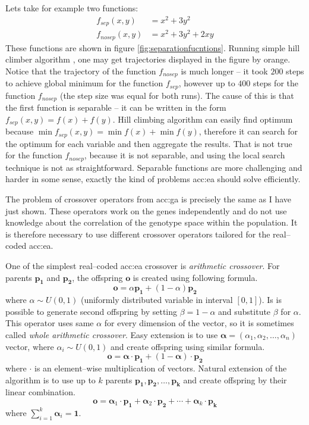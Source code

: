 Lets take for example two functions:
\begin{align*}
    f_{sep}(x,y)&=x^2+3y^2 \\
    f_{nosep}(x,y)&=x^2+3y^2+2xy
\end{align*}
These functions are shown in figure \ref{fig:separationfucntions}. Running simple hill climber algorithm \citep{HandbookOfMetaheuristics}, one may get trajectories displayed in the figure by orange. Notice that the trajectory of the function $f_{nosep}$ is much longer -- it took $200$ steps to achieve global minimum for the function $f_{sep}$, however up to $400$ steps for the function $f_{nosep}$ (the step size was equal for both runs). The cause of this is that the first function is separable -- it can be written in the form $f_{sep}(x,y)=f(x)+f(y)$. Hill climbing algorithm can easily find optimum because $\min f_{sep}(x,y)=\min f(x)+\min f(y)$, therefore it can search for the optimum for each variable and then aggregate the results. That is not true for the function $f_{nosep}$, because it is not separable, and using the local search technique is not as straightforward. Separable functions are more challenging and harder in some sense, exactly the kind of problems \acrshort{acc:ea} should solve efficiently.

The problem of crossover operators from \acrshort{acc:ga} is precisely the same as I have just shown. These operators work on the genes independently and do not use knowledge about the correlation of the genotype space within the population. It is therefore necessary to use different crossover operators tailored for the real--coded \acrshort{acc:ea}.

One of the simplest real--coded \acrshort{acc:ea} crossover is \emph{arithmetic crossover}. For parents $\mathbf{p_1}$ and $\mathbf{p_2}$, the offspring $\mathbf{o}$ is created using following formula.
$$
\mathbf{o} = \alpha\mathbf{p_1}+\left(1-\alpha\right)\mathbf{p_2}
$$
where $\alpha \sim U(0,1)$ (uniformly distributed variable in interval $\left[0,1\right]$). Is is possible to generate second offspring by setting $\beta=1-\alpha$ and substitute $\beta$ for $\alpha$. This operator uses same $\alpha$ for every dimension of the vector, so it is sometimes called \emph{whole arithmetic crossover}. Easy extension is to use $\boldsymbol{\alpha}=(\alpha_1,\alpha_2,\dots,\alpha_n)$ vector, where $\alpha_i\sim U(0,1)$ and create offspring using similar formula.
$$
\mathbf{o} = \boldsymbol{\alpha}\cdot\mathbf{p_1}+\left(1-\boldsymbol{\alpha}\right)\cdot\mathbf{p_2}
$$
where $\cdot$ is an element--wise multiplication of vectors.
Natural extension of the algorithm is to use up to $k$ parents $\mathbf{p_1}, \mathbf{p_2},\dots,\mathbf{p_k}$ and create offspring by their linear combination.
$$
\mathbf{o} = 
\boldsymbol{\alpha}_1\cdot\mathbf{p_1}+
\boldsymbol{\alpha}_2\cdot\mathbf{p_2}+
\cdots +
\boldsymbol{\alpha}_k\cdot\mathbf{p_k}
$$
where $\sum_{i=1}^{k}\boldsymbol{\alpha}_i=\boldsymbol{1}$.

